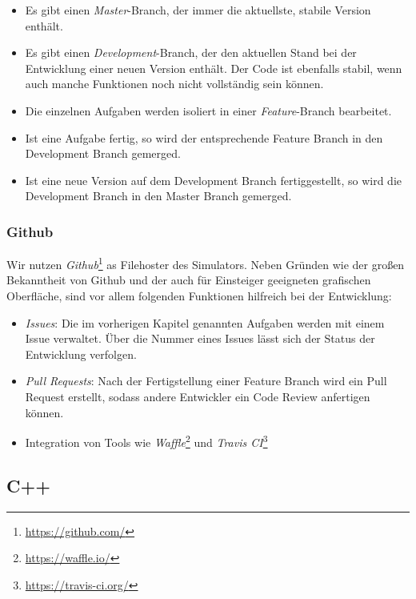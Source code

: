 \begin{itemize}
	\item Es gibt einen \textit{Master}-Branch, der immer die aktuellste, stabile Version enthält.
	\item Es gibt einen \textit{Development}-Branch, der den aktuellen Stand bei der Entwicklung
	einer neuen Version enthält. Der Code ist ebenfalls stabil, wenn auch manche Funktionen noch
	nicht vollständig sein können.
	\item Die einzelnen Aufgaben werden isoliert in einer \textit{Feature}-Branch bearbeitet.
	\item Ist eine Aufgabe fertig, so wird der entsprechende Feature Branch in den Development
	Branch gemerged.
	\item Ist eine neue Version auf dem Development Branch fertiggestellt, so wird die Development
	Branch in den Master Branch gemerged.
\end{itemize}

\subsubsection{Github}


Wir nutzen \textit{Github}\footnote{\url{https://github.com/}} as Filehoster des Simulators. Neben
Gründen wie der großen Bekanntheit von Github und der auch für Einsteiger geeigneten grafischen
Oberfläche, sind vor allem folgenden Funktionen hilfreich bei der Entwicklung:

\begin{itemize}
	\item \textit{Issues}: Die im vorherigen Kapitel genannten Aufgaben werden mit einem Issue
	verwaltet. Über die Nummer eines Issues lässt sich der Status der Entwicklung verfolgen.
	\item \textit{Pull Requests}: Nach der Fertigstellung einer Feature Branch wird ein Pull Request
	erstellt, sodass andere Entwickler ein Code Review anfertigen können.
	\item Integration von Tools wie \textit{Waffle}\footnote{\url{https://waffle.io/}} und
	\textit{Travis CI}\footnote{\url{https://travis-ci.org/}}
\end{itemize}

\subsection{C++}

